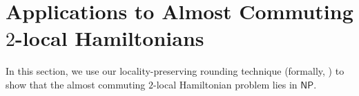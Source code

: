 \documentclass[11pt]{article}
\theoremstyle{plain}
\newcommand{\AnandNote}[1]{\textcolor{red}{(Anand: #1)}}
\newcommand{\AnandNote}[1]{}
\begin{document}



\fi
\section{Applications to Almost Commuting $2$-local Hamiltonians}
In this section, we use our locality-preserving rounding technique (formally,  ) to show that the almost commuting $2$-local Hamiltonian problem lies in $\mathsf{NP}$.
\end{document}

